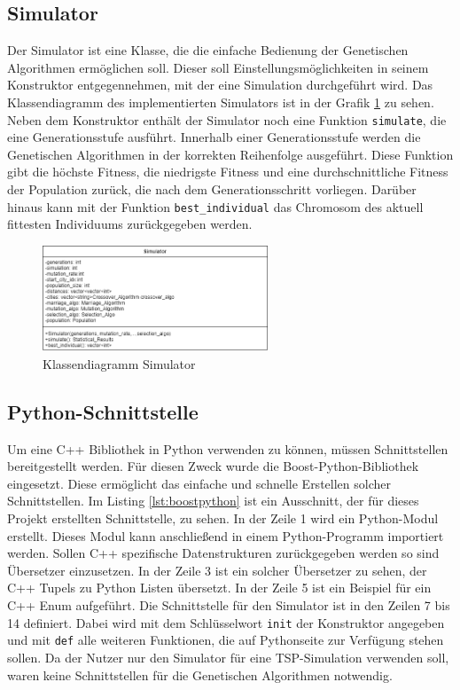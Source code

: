 \subsection{Simulator}
Der Simulator ist eine Klasse, die die einfache Bedienung der Genetischen Algorithmen ermöglichen soll. Dieser soll Einstellungsmöglichkeiten in seinem Konstruktor entgegennehmen, mit der eine Simulation durchgeführt wird. Das Klassendiagramm des implementierten Simulators ist in der Grafik \ref{fig:simulator} zu sehen. Neben dem Konstruktor enthält der Simulator noch eine Funktion \texttt{simulate}, die eine Generationsstufe ausführt. Innerhalb einer Generationsstufe werden die Genetischen Algorithmen in der korrekten Reihenfolge ausgeführt. Diese Funktion gibt die höchste Fitness, die niedrigste Fitness und eine durchschnittliche Fitness der Population zurück, die nach dem Generationsschritt vorliegen. Darüber hinaus kann mit der Funktion \texttt{best\_individual} das Chromosom des aktuell fittesten Individuums zurückgegeben werden.

\begin{figure}[H]
\centering
\includegraphics[width=0.6\textwidth]{img/Vortrag/simulator.png}
\caption{Klassendiagramm Simulator}
\label{fig:simulator}
\end{figure}

\subsection{Python-Schnittstelle}
Um eine C++ Bibliothek in Python verwenden zu können, müssen Schnittstellen bereitgestellt werden. Für diesen Zweck wurde die Boost-Python-Bibliothek eingesetzt. Diese ermöglicht das einfache und schnelle Erstellen solcher Schnittstellen. Im Listing \ref{lst:boostpython} ist ein Ausschnitt, der für dieses Projekt erstellten Schnittstelle, zu sehen. In der Zeile 1 wird ein Python-Modul erstellt. Dieses Modul kann anschließend in einem Python-Programm importiert werden. Sollen C++ spezifische Datenstrukturen zurückgegeben werden so sind Übersetzer einzusetzen. In der Zeile 3 ist ein solcher Übersetzer zu sehen, der C++ Tupels zu Python Listen übersetzt. In der Zeile 5 ist ein Beispiel für ein C++ Enum aufgeführt. Die Schnittstelle für den Simulator ist in den Zeilen 7 bis 14 definiert. Dabei wird mit dem Schlüsselwort \texttt{init} der Konstruktor angegeben und mit \texttt{def} alle weiteren Funktionen, die auf Pythonseite zur Verfügung stehen sollen. Da der Nutzer nur den Simulator für eine TSP-Simulation verwenden soll, waren keine Schnittstellen für die Genetischen Algorithmen notwendig.

